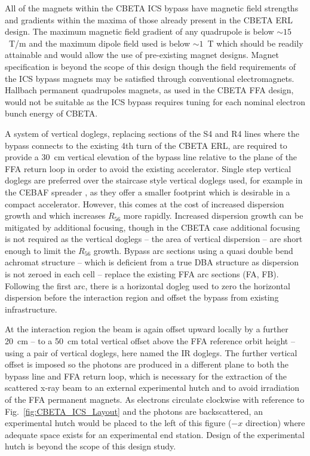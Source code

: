 \documentclass[../main.tex]{subfiles}
\begin{document}
All of the magnets within the CBETA ICS bypass have magnetic field strengths and gradients within the maxima of those already present in the CBETA ERL design. The maximum magnetic field gradient of any quadrupole is below $\sim15$~\si{\tesla}/\si{\meter} and the maximum dipole field used is below $\sim1$~\si{\tesla} which should be readily attainable and would allow the use of pre-existing magnet designs. Magnet specification is beyond the scope of this design though the field requirements of the ICS bypass magnets may be satisfied through conventional electromagnets. Hallbach permanent quadrupoles magnets, as used in the CBETA FFA design, would not be suitable as the ICS bypass requires tuning for each nominal electron bunch energy of CBETA. 

A system of vertical doglegs, replacing sections of the S4 and R4 lines where the bypass connects to the existing 4th turn of the CBETA ERL, are required to provide a 30~\si{\centi\meter} vertical elevation of the bypass line relative to the plane of the FFA return loop in order to avoid the existing accelerator. Single step vertical doglegs are preferred over the staircase style vertical doglegs used, for example in the CEBAF spreader \cite{york1987optics}, as they offer a smaller footprint which is desirable in a compact accelerator. However, this comes at the cost of increased dispersion growth and which increases $R_{56}$ more rapidly. Increased dispersion growth can be mitigated by additional focusing, though in the CBETA case additional focusing is not required as the vertical doglegs -- the area of vertical dispersion -- are short enough to limit the $R_{56}$ growth. Bypass arc sections using a quasi double bend achromat structure -- which is deficient from a true DBA structure as dispersion is not zeroed in each cell -- replace the existing FFA arc sections (FA, FB). Following the first arc, there is a horizontal dogleg used to zero the horizontal dispersion before the interaction region and offset the bypass from existing infrastructure. 

At the interaction region the beam is again offset upward locally by a further 20~\si{\centi\meter} -- to a 50~\si{\centi\meter} total vertical offset above the FFA reference orbit height -- using a pair of vertical doglegs, here named the IR doglegs. The further vertical offset is imposed so the photons are produced in a different plane to both the bypass line and FFA return loop, which is necessary for the extraction of the scattered x-ray beam to an external experimental hutch and to avoid irradiation of the FFA permanent magnets. As electrons circulate clockwise with reference to Fig.~\ref{fig:CBETA_ICS_Layout} and the photons are backscattered, an experimental hutch would be placed to the left of this figure ($-x$ direction) where adequate space exists for an experimental end station. Design of the experimental hutch is beyond the scope of this design study. 
\end{document}
